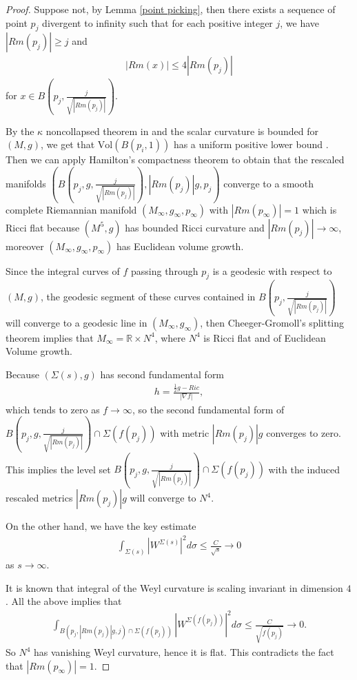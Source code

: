 \documentclass[12pt]{amsart}
\newcommand{\ban}{\begin{eqnarray*}}
\newcommand{\ean}{\end{eqnarray*}}
\begin{document}
\begin{proof}
	Suppose not, by Lemma \ref{point picking}, then there exists a sequence of point $p_j$ divergent to infinity such that for each positive integer $j$, we have $|Rm(p_j)|\geq j$ and
	\ban
	|Rm(x)|\leq 4 |Rm(p_j)|
	\ean
	for $x\in B(p_j, \frac{j}{\sqrt{|Rm(p_j)|}})$.
	
	By the $\kappa$ noncollapsed theorem in \cite{Li-Wang} and the scalar curvature is bounded for $(M, g)$, we get that $\text{Vol}(B(p_i, 1))$ has a uniform positive lower bound \cite{Li-Wang}.  Then we can apply Hamilton's compactness theorem to obtain that the rescaled manifolds $\left(B(p_j, g, \frac{j}{\sqrt{|Rm(p_j)|}}),  |Rm(p_j)|g, p_j\right)$ converge to a smooth complete Riemannian manifold $(M_\infty, g_\infty, p_\infty)$ with $|Rm(p_\infty)|=1$ which is Ricci flat because $(M^5, g)$ has bounded Ricci curvature and $|Rm(p_j)|\rightarrow \infty$, moreover  $(M_\infty, g_\infty, p_\infty)$ has Euclidean volume growth.
	
	\smallskip
	Since the integral curves of $f$ passing through $p_j$ is a geodesic with respect to $(M, g)$, the geodesic segment of these curves contained in $B\left( p_j, \frac{j}{\sqrt{|Rm(p_j)|}}\right) $ will converge to a geodesic line in $(M_\infty, g_\infty)$, then Cheeger-Gromoll's splitting theorem \cite{Cheeger-Gromoll} implies that $M_\infty =\mathbb{R}\times N^4$, where $N^4$ is Ricci flat and of Euclidean Volume growth.
	
	\smallskip
	Because $(\Sigma(s), g)$ has second fundamental form
	\ban
	h=\frac{\frac{1}{2}g-Ric}{|\nabla f|},
	\ean
	which tends to zero as $f\rightarrow \infty$,
	so the second fundamental form of $B\left( p_j, g, \frac{j}{\sqrt{|Rm(p_j)|}}\right)   \cap \Sigma(f(p_j))$ with metric $|Rm(p_j)|g$ converges to zero. This implies the level set $B\left( p_j, g, \frac{j}{\sqrt{|Rm(p_j)|}}\right)   \cap \Sigma(f(p_j))$ with the induced rescaled metrics $|Rm(p_j)|g$ will converge to $N^4$.
	
	\smallskip
	On the  other hand, we have the key estimate
	\ban
	\int_{\Sigma(s)}|W^{\Sigma(s)}|^2d\sigma\leq \frac{C}{\sqrt{s}}\rightarrow 0
	\ean
	as $s\rightarrow\infty$.
	
	\smallskip
	It is known that integral of the Weyl curvature is scaling invariant in dimension $4$.
	All the above implies that
	\ban
	\int_{B(p_j, |Rm(p_j)|g, j)  \cap \Sigma(f(p_j))}|W^{\Sigma(f(p_j))}|^2d\sigma\leq  \frac{C}{\sqrt{f(p_j)}}\rightarrow 0.
	\ean
	So $N^4$ has vanishing Weyl curvature, hence it is flat. This contradicts the fact that $|Rm(p_\infty)|=1$.
\end{proof}
\end{document}
